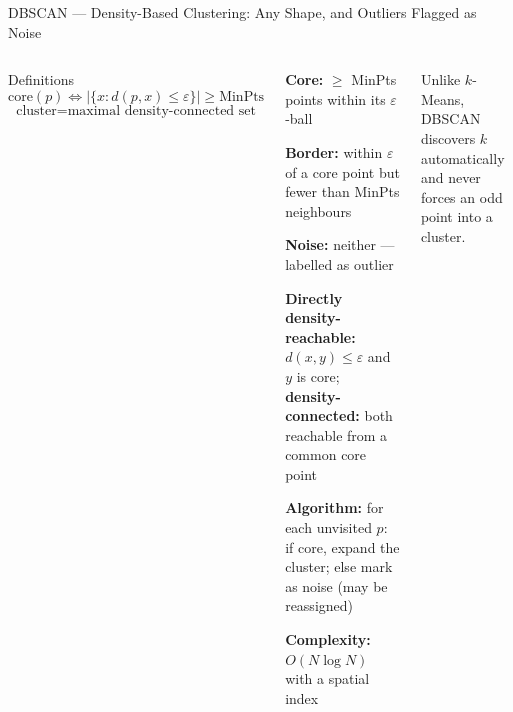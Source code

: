\documentclass[aspectratio=169,10pt,t]{beamer}
\begin{document}
\begin{frame}{DBSCAN --- Density-Based Clustering: Any Shape, and Outliers Flagged as Noise}
\begin{columns}[T]
\begin{fbx}{Definitions}\[\text{core}(p)\iff\big|\{x:d(p,x)\le\varepsilon\}\big|\ge\text{MinPts}\]\[\text{cluster}=\text{maximal density-connected set}\]\end{fbx}
\begin{tl}\item \textbf{Core:} $\ge$ MinPts points within its $\varepsilon$-ball\item \textbf{Border:} within $\varepsilon$ of a core point but fewer than MinPts neighbours\item \textbf{Noise:} neither --- labelled as outlier\item \textbf{Directly density-reachable:} $d(x,y)\le\varepsilon$ and $y$ is core; \textbf{density-connected:} both reachable from a common core point\item \textbf{Algorithm:} for each unvisited $p$: if core, expand the cluster; else mark as noise (may be reassigned)\item \textbf{Complexity:} $O(N\log N)$ with a spatial index\end{tl}
\begin{ibox}\scriptsize Unlike $k$-Means, DBSCAN discovers $k$ automatically and never forces an odd point into a cluster.\end{ibox}
\end{columns}
\end{frame}
\end{document}
